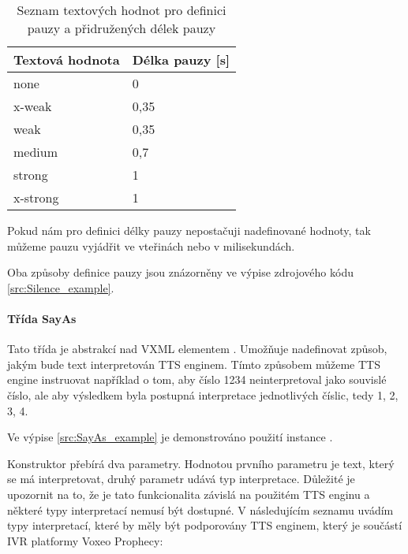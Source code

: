 \documentclass[ing,male,java,dept460]{diploma}						%
\begin{document}
\begin{table}
	\centering
	\begin{tabular}{|l|l|}
		\hline
		Textová hodnota & Délka pauzy [s] \\
		\hline
		none & 0 \\
		\hline
		x-weak & 0,35 \\
		\hline
		weak & 0,35 \\
		\hline
		medium & 0,7 \\
		\hline
		strong & 1 \\
		\hline
		x-strong & 1 \\
		\hline
	\end{tabular}
	\caption{Seznam textových hodnot pro definici pauzy a přidružených délek pauzy}
	\label{tab:Silence_pauses}
\end{table}

Pokud nám pro definici délky pauzy nepostačuji nadefinované hodnoty, tak můžeme pauzu vyjádřit ve vteřinách nebo v milisekundách.

Oba způsoby definice pauzy jsou znázorněny ve výpise zdrojového kódu \ref{src:Silence_example}.



\paragraph{Třída SayAs}
\label{sec:SayAs}
Tato třída je abstrakcí nad VXML elementem . Umožňuje nadefinovat způsob, jakým bude text interpretován TTS enginem. Tímto způsobem můžeme TTS engine instruovat například o tom, aby číslo 1234 neinterpretoval jako souvislé číslo, ale aby výsledkem byla postupná interpretace jednotlivých číslic, tedy 1, 2, 3, 4.

Ve výpise \ref{src:SayAs_example} je demonstrováno použití instance .



Konstruktor přebírá dva parametry. Hodnotou prvního parametru je text, který se má interpretovat, druhý parametr udává typ interpretace. Důležité je upozornit na to, že je tato funkcionalita závislá na použitém TTS enginu a některé typy interpretací nemusí být dostupné. V následujícím seznamu uvádím typy interpretací, které by měly být podporovány TTS enginem, který je součástí IVR platformy Voxeo Prophecy\cite{vxml_org}:
\end{document}
